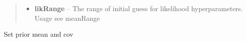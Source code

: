 \documentclass[letterpaper,10pt,english]{sphinxmanual}
\begin{document}
\begin{fulllineitems}
\begin{fulllineitems}
\begin{quote}
\begin{description}
\begin{itemize}
\item {} 
\textbf{likRange} -- The range of initial guess for likelihood hyperparameters. Usage see meanRange

\end{itemize}

\end{description}\end{quote}

\end{fulllineitems}


\begin{fulllineitems}
\label{pyGPs.Core:pyGPs.Core.gp.GP.setPrior}
Set prior mean and cov

\end{fulllineitems}


\end{fulllineitems}

\end{document}
